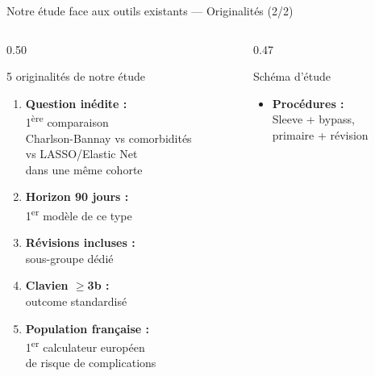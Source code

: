 \documentclass[aspectratio=169]{beamer}
\newcommand{\tightlist}{%
  \setlength{\itemsep}{1pt}\setlength{\parskip}{0pt}%
  \setlength{\parsep}{0pt}\setlength{\topsep}{2pt}}
\begin{document}
\begin{frame}{Notre étude face aux outils existants --- Originalités (2/2)}
  \begin{columns}[T]
    \begin{column}{0.50\textwidth}
      \begin{exampleblock}{5 originalités de notre étude}
        \footnotesize
        \begin{enumerate}\tightlist
          \item \textbf{Question inédite :}\\
                1\textsuperscript{ère} comparaison\\
                Charlson-Bannay vs comorbidités\\
                vs LASSO/Elastic Net\\
                dans une même cohorte\\[4pt]
          \item \textbf{Horizon 90 jours :}\\
                1\textsuperscript{er} modèle de ce type\\[4pt]
          \item \textbf{Révisions incluses :}\\
                sous-groupe dédié\\[4pt]
          \item \textbf{Clavien $\geq$3b :}\\
                outcome standardisé\\[4pt]
          \item \textbf{Population française :}\\
                1\textsuperscript{er} calculateur européen\\
                de risque de complications
        \end{enumerate}
      \end{exampleblock}
    \end{column}
    \begin{column}{0.47\textwidth}
      \begin{block}{Schéma d'étude}
        \footnotesize
        \begin{itemize}\tightlist
          \item \textbf{Procédures :}\\
                Sleeve + bypass,\\
                primaire + révision\\[4pt]

\end{itemize}
\end{block}
\end{column}
\end{columns}
\end{frame}
\end{document}
